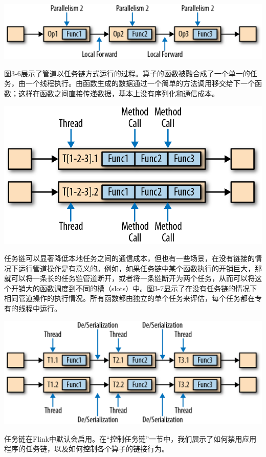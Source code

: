 \documentclass[oneside]{ctexbook}
\begin{document}
\noindent \includegraphics[width=\textwidth]{spaf_0305.png}

图3-6展示了管道以任务链方式运行的过程。算子的函数被融合成了一个单一的任务，由一个线程执行。由函数生成的数据通过一个简单的方法调用移交给下一个函数；这样在函数之间直接传递数据，基本上没有序列化和通信成本。

\noindent \includegraphics[width=\textwidth]{spaf_0306.png}

任务链可以显著降低本地任务之间的通信成本，但也有一些场景，在没有链接的情况下运行管道操作是有意义的。例如，如果任务链中某个函数执行的开销巨大，那就可以将一条长的任务链管道断开，或者将一条链断开为两个任务，从而可以将这个开销大的函数调度到不同的槽（slots）中。图3-7显示了在没有任务链的情况下相同管道操作的执行情况。所有函数都由独立的单个任务来评估，每个任务都在专有的线程中运行。

\noindent \includegraphics[width=\textwidth]{spaf_0307.png}

任务链在Flink中默认会启用。在“控制任务链”一节中，我们展示了如何禁用应用程序的任务链，以及如何控制各个算子的链接行为。
\end{document}

